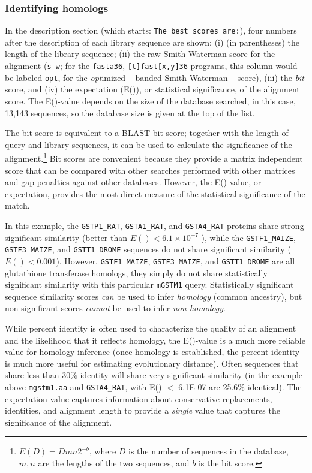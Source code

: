 \documentclass[11pt]{article}
\begin{document}
\subsubsection{Identifying homologs}
In the description section (which starts: \texttt{The best scores
  are:}), four numbers after the description of each library sequence
are shown: (i) (in parentheses) the length of the library sequence;
(ii) the raw Smith-Waterman score for the alignment (\texttt{s-w}; for
the \texttt{fasta36}, \texttt{[t]fast[x,y]36} programs, this column
would be labeled \texttt{opt}, for the \emph{opt}imized -- banded
Smith-Waterman -- score), (iii) the \emph{bit} score, and (iv) the
expectation (E()), or statistical significance, of the alignment
score.  The E()-value depends on the size of the database searched, in
this case, 13,143 sequences, so the database size is given at the top
of the list.

The bit score is equivalent to a BLAST bit score; together with the
length of query and library sequences, it can be used to calculate the
significance of the alignment.\footnote{$E(D) = D m n 2^{-b}$,
where $D$ is the number of sequences in the database, $m, n$ are the
lengths of the two sequences, and $b$ is the bit score.}  Bit scores
are convenient because they provide a matrix independent score that
can be compared with other searches performed with other matrices and
gap penalties against other databases.  However, the E()-value, or
expectation, provides the most direct measure of the statistical
significance of the match.

In this example, the \texttt{GSTP1\_RAT}, \texttt{GSTA1\_RAT}, and
\texttt{GSTA4\_RAT} proteins share strong significant similarity
(better than $E() < 6.1 \times 10^{-7}$ ), while the
\texttt{GSTF1\_MAIZE}, \texttt{GSTF3\_MAIZE}, and
\texttt{GSTT1\_DROME} sequences do not share significant similarity
($E() < 0.001$).  However, \texttt{GSTF1\_MAIZE},
\texttt{GSTF3\_MAIZE}, and \texttt{GSTT1\_DROME} are all glutathione
transferase homologs, they simply do not share statistically
significant similarity with this particular \texttt{mGSTM1} query.
Statistically significant sequence similarity scores \emph{can} be
used to infer \emph{homology} (common ancestry), but non-significant
scores \emph{cannot} be used to infer \emph{non-homology}.

While percent identity is often used to characterize the quality of an
alignment and the likelihood that it reflects homology, the E()-value
is a much more reliable value for homology inference (once homology is
established, the percent identity is much more useful for estimating
evolutionary distance).  Often sequences that share less than 30\%
identity will share very significant similarity (in the example above
\texttt{mgstm1.aa} and \texttt{GSTA4\_RAT}, with E() $<$ 6.1E-07 are
25.6\% identical).  The expectation value captures information about
conservative replacements, identities, and alignment length to provide
a \emph{single} value that captures the significance of the alignment.
\end{document}

